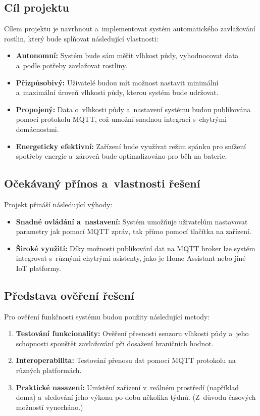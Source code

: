 \documentclass[a4paper, 11pt]{article}
\begin{document}
\subsection{Cíl projektu}
Cílem projektu je navrhnout a~implementovat systém automatického zavlažování rostlin, který bude splňovat následující vlastnosti:
\begin{itemize}
    \item \textbf{Autonomní:} Systém bude sám měřit vlhkost půdy, vyhodnocovat data a~podle potřeby zavlažovat rostliny.
    \item \textbf{Přizpůsobivý:} Uživatelé budou mít možnost nastavit minimální a~maximální úroveň vlhkosti půdy, kterou systém bude udržovat.
    \item \textbf{Propojený:} Data o~vlhkosti půdy a~nastavení systému budou publikována pomocí protokolu MQTT, což umožní snadnou integraci s~chytrými domácnostmi.
    \item \textbf{Energeticky efektivní:} Zařízení bude využívat režim spánku pro snížení spotřeby energie a~zároveň bude optimalizováno pro běh na baterie.
\end{itemize}

\subsection{Očekávaný přínos a~vlastnosti řešení}
Projekt přináší následující výhody:
\begin{itemize}
    \item \textbf{Snadné ovládání a~nastavení:} Systém umožňuje uživatelům nastavovat parametry jak pomocí MQTT zpráv, tak přímo pomocí tlačítka na zařízení.
    \item \textbf{Široké využití:} Díky možnosti publikování dat na MQTT broker lze systém integrovat s~různými chytrými asistenty, jako je Home Assistant nebo jiné IoT platformy.
\end{itemize}

\subsection{Představa ověření řešení}
Pro ověření funkčnosti systému budou použity následující metody:
\begin{enumerate}
    \item \textbf{Testování funkcionality:} Ověření přesnosti senzoru vlhkosti půdy a~jeho schopnosti spouštět zavlažování při dosažení hraničních hodnot.
    \item \textbf{Interoperabilita:} Testování přenosu dat pomocí MQTT protokolu na různých platformách.
    \item \textbf{Praktické nasazení:} Umístění zařízení v~reálném prostředí (například doma) a~sledování jeho výkonu po dobu několika týdnů. (Z~důvodu časových možností vynecháno.)
\end{enumerate}
\end{document}
